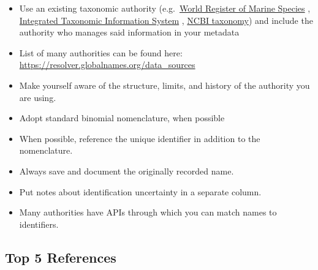 \documentclass[
  oneside]{book}
\providecommand{\tightlist}{%
  \setlength{\itemsep}{0pt}\setlength{\parskip}{0pt}}
\begin{document}
\begin{itemize}
\tightlist
\item
  Use an existing taxonomic authority (e.g.~\href{https://www.marinespecies.org/}{World Register of Marine Species} , \href{https://itis.gov/}{Integrated Taxonomic Information System} , \href{https://www.ncbi.nlm.nih.gov/taxonomy}{NCBI taxonomy}) and include the authority who manages said information in your metadata
\item
  List of many authorities can be found here: \url{https://resolver.globalnames.org/data_sources}
\item
  Make yourself aware of the structure, limits, and history of the authority you are using.
\item
  Adopt standard binomial nomenclature, when possible
\item
  When possible, reference the unique identifier in addition to the nomenclature.
\item
  Always save and document the originally recorded name.
\item
  Put notes about identification uncertainty in a separate column.
\item
  Many authorities have APIs through which you can match names to identifiers.
\end{itemize}

\hypertarget{top-5-references-3}{%
\subsection{Top 5 References}\label{top-5-references-3}}
\end{document}

